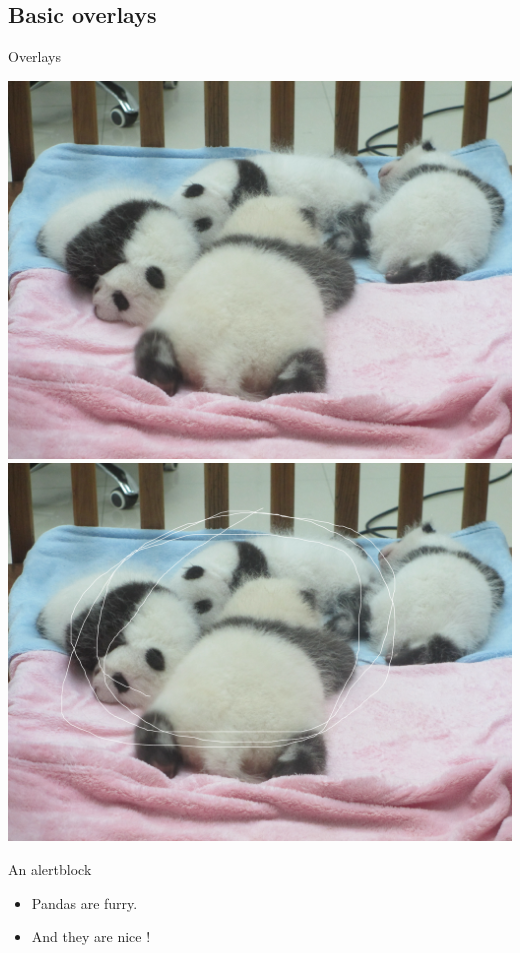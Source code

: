 \documentclass[11pt]{beamer}
\begin{document}
\subsection{Basic overlays}

\begin{frame}{Overlays }

    \begin{overprint}
         \includegraphics[width = .55\textwidth]{../figures/panda_puppies}
         \includegraphics[width = .55\textwidth]{../figures/panda_puppies_v1}
    \end{overprint}

    \begin{alertblock}{An alertblock}
        \begin{itemize}
            \pause
            \item Pandas are furry.
                  \pause
            \item And they are nice !
        \end{itemize}
    \end{alertblock}
\end{frame}
\end{document}
